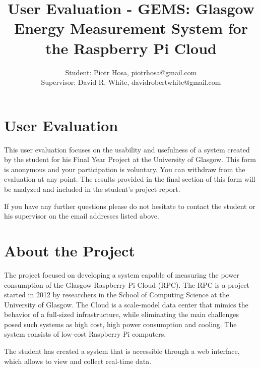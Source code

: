 \documentclass[12pt]{article}
\begin{document}

\title{User Evaluation - GEMS: Glasgow Energy Measurement System for the Raspberry Pi Cloud}
\author{Student: Piotr Hosa, piotrhosa@gmail.com\\Supervisor: David R. White, davidrobertwhite@gmail.com}
\date{\vspace{-5ex}}
\maketitle

\section{User Evaluation}
This user evaluation focuses on the usability and usefulness of a system created by the student for his Final Year Project at the University of Glasgow. This form is anonymous and your participation is voluntary. You can withdraw from the evaluation at any point. The results provided in the final section of this form will be analyzed and included in the student's project report. 

If you have any further questions please do not hesitate to contact the student or his supervisor on the email addresses listed above.

\section{About the Project}
The project focused on developing a system capable of measuring the power consumption of the Glasgow Raspberry Pi Cloud (RPC). The RPC is a project started in 2012 by researchers in the School of Computing Science at the University of Glasgow. The Cloud is a scale-model data center that mimics the behavior of a full-sized infrastructure, while eliminating the main challenges posed such systems as high cost, high power consumption and cooling. The system consists of low-cost Raspberry Pi computers.

The student has created a system that is accessible through a web interface, which allows to view and collect real-time data. 
\end{document}
